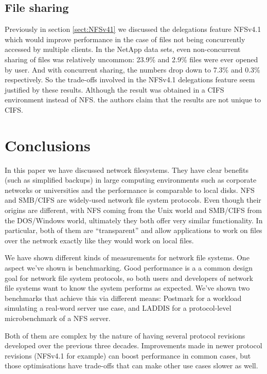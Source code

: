 \subsection{File sharing}

Previously in section \ref{sect:NFSv41} we discussed the delegations feature NFSv4.1 which would improve performance in the case of files not being concurrently accessed by multiple clients.
In the NetApp data sets, even non-concurrent sharing of files was relatively uncommon: 23.9\% and 2.9\% files were ever opened by user.
And with concurrent sharing, the numbers drop down to 7.3\% and 0.3\% respectively.
So the trade-offs involved in the NFSv4.1 delegations feature seem justified by these results.
Although the result was obtained in a CIFS environment instead of NFS.
the authors claim that the results are not unique to CIFS.

\section{Conclusions}
In this paper we have discussed network filesystems.
They have clear benefits (such as simplified backups) in large computing environments such as corporate networks or universities
and the performance is comparable to local disks.
NFS and SMB/CIFS are widely-used network file system protocols.
Even though their origins are different, with NFS coming from the Unix world
and SMB/CIFS from the DOS/Windows world, ultimately they both offer very similar functionality.
In particular, both of them are ``transparent'' and allow applications to work on files over the network
exactly like they would work on local files.

We have shown different kinds of measurements for network file systems.
One aspect we've shown is benchmarking.
Good performance is a a common design goal for network file system protocols,
so both users and developers of network file systems want to know the system performs as expected.
We've shown two benchmarks that achieve this via different means:
Postmark for a workload simulating a real-word server use case,
and LADDIS for a protocol-level microbenchmark of a NFS server.

Both of them are complex by the nature of having several protocol revisions developed over the previous three decades.
Improvements made in newer protocol revisions (NFSv4.1 for example) can boost performance in common cases,
but those optimisations have trade-offs that can make other use cases slower as well.
